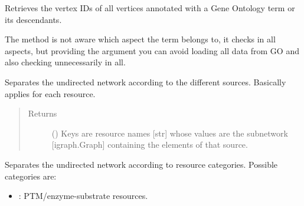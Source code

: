 \documentclass[letterpaper,10pt,english]{sphinxmanual}
\begin{document}
\begin{fulllineitems}
\begin{fulllineitems}
\label{\detokenize{main:pypath.main.PyPath.select_by_go_single}}
Retrieves the vertex IDs of all vertices annotated with a Gene
Ontology term or its descendants.

The method is not aware which aspect the term belongs to, it checks
in all aspects, but providing the  argument you can
avoid loading all data from GO and also checking unnecessarily in
all.

\end{fulllineitems}


\begin{fulllineitems}
\label{\detokenize{main:pypath.main.PyPath.separate}}
Separates the undirected network according to the different
sources. Basically applies
{\hyperref[\detokenize{main:pypath.main.PyPath.get_network}]{}} for each resource.
\begin{quote}\begin{description}
\item[{Returns}] \leavevmode
() \textendash{} Keys are resource names {[}str{]} whose values are
the subnetwork {[}igraph.Graph{]} containing the elements of
that source.

\end{description}\end{quote}

\end{fulllineitems}


\begin{fulllineitems}
\label{\detokenize{main:pypath.main.PyPath.separate_by_category}}
Separates the undirected network according to resource
categories. Possible categories are:
\begin{itemize}
\item {} 
: PTM/enzyme-substrate resources.


\end{itemize}
\end{fulllineitems}
\end{fulllineitems}
\end{document}
